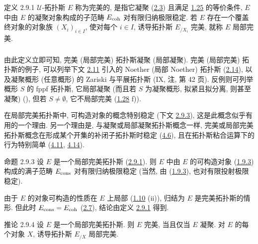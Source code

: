 \begin{enonce*}{定义 2.9.1}
$𝒰$-拓扑斯 $E$ 称为完美的,
是指它凝聚 (\hyperref[VI.def2.3]{2.3})
且满足 \hyperref[VI.cor1.25]{1.25} 的等价条件,
\ie $E$ 中由 $E$ 的凝聚对象构成的子范畴 $E_{\mathrm{coh}}$ 对有限归纳极限稳定.
若 $E$ 存在一个覆盖终对象的对象族 $(X_i)_{i\in I}$,
使对每个 $i\in I$, 诱导拓扑斯 $E_{/X_i}$ 完美,
就称 $E$ 局部完美.
\end{enonce*}

\setcounter{subsection}{9}
\setcounter{subsubsection}{1}
\subsubsection{}

由此定义立即可知,
完美 (\resp 局部完美) 拓扑斯凝聚 (\resp 局部凝聚).
完美 (\resp 局部完美) 拓扑斯的例子,
可以列举下文 \hyperref[VI.def2.11]{2.11} 引入的
Noether (\resp 局部 Noether) 拓扑斯
(\cf \hyperref[VI.subsec2.14]{2.14}),
以及凝聚概形 (\resp 任意概形) 的 Zariski 与平展拓扑斯
(IX, 注, 第 42 页).
反例\pageoriginale{}则可列举概形 $S$ 的 fppf 拓扑斯,
它局部凝聚
(而且若 $S$ 为凝聚概形, \ie 拟紧且拟分离, 则甚至凝聚)
(),
但若 $S\neq∅$, 它不局部完美 (\hyperref[VI.exer1.28]{1.28} f)).

在局部完美拓扑斯中, 可构造对象的概念特别稳定
(下文 \hyperref[VI.prop2.9.3]{2.9.3}),
这是此概念似乎有用的一个理由.
另一个理由是, 与凝聚或局部凝聚拓扑斯概念一样,
完美或局部完美拓扑斯概念在形成某个开集的补闭子拓扑斯时稳定
(\hyperref[VI.prop4.6]{4.6}),
且在拓扑斯粘合运算下的行为特别简单
(\hyperref[VI.cor4.11]{4.11}, \hyperref[VI.cor4.14]{4.14}).

\begin{enonce*}{命题 2.9.3}
设 $E$ 是一个局部完美拓扑斯 (\hyperref[VI.def2.9.1]{2.9.1}).
则 $E$ 中由 $E$ 的可构造对象
(\hyperref[VI.subsubsec1.9.3]{1.9.3}) 构成的满子范畴 $E_{\operatorname{cons}}$
对有限归纳极限稳定
(当然, 由 (\hyperref[VI.subsubsec1.9.3]{1.9.3}), 也对有限投射极限稳定).
\end{enonce*}

由于 $E$ 的对象可构造的性质在 $E$ 上局部
(\hyperref[VI.prop1.10]{1.10} (ii)),
归结为 $E$ 是完美拓扑斯的情形.
但此时 $E_{\operatorname{cons}}=E_{\mathrm{coh}}$ (\hyperref[VI.cor2.7]{2.7}),
结论由定义 \hyperref[VI.def2.9.1]{2.9.1} 得到.

\begin{enonce*}{推论 2.9.4}
设\pageoriginale{} $E$ 是一个局部完美拓扑斯.
则 $E$ 完美, 当且仅当 $E$ 凝聚.
对 $E$ 的每个对象 $X$, 诱导拓扑斯 $E_{/X}$ 局部完美.
\end{enonce*}


